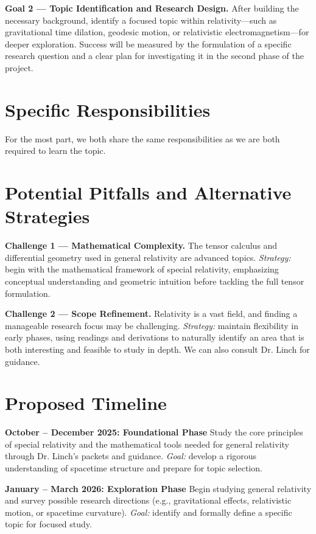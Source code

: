 \documentclass[12pt]{article}
\begin{document}
\textbf{Goal 2 — Topic Identification and Research Design.}  
After building the necessary background, identify a focused topic within relativity—such as gravitational time dilation, geodesic motion, or relativistic electromagnetism—for deeper exploration. Success will be measured by the formulation of a specific research question and a clear plan for investigating it in the second phase of the project.

\section*{Specific Responsibilities}

For the most part, we both share the same responsibilities as we are both required to learn the topic.

\section*{Potential Pitfalls and Alternative Strategies}

\textbf{Challenge 1 — Mathematical Complexity.}  
The tensor calculus and differential geometry used in general relativity are advanced topics.  
\textit{Strategy:} begin with the mathematical framework of special relativity, emphasizing conceptual understanding and geometric intuition before tackling the full tensor formulation.

\textbf{Challenge 2 — Scope Refinement.}  
Relativity is a vast field, and finding a manageable research focus may be challenging.  
\textit{Strategy:} maintain flexibility in early phases, using readings and derivations to naturally identify an area that is both interesting and feasible to study in depth. We can also consult Dr. Linch for guidance.

\section*{Proposed Timeline}

\textbf{October – December 2025: Foundational Phase}  
Study the core principles of special relativity and the mathematical tools needed for general relativity through Dr. Linch's packets and guidance.
\textit{Goal:} develop a rigorous understanding of spacetime structure and prepare for topic selection.

\textbf{January – March 2026: Exploration Phase}  
Begin studying general relativity and survey possible research directions (e.g., gravitational effects, relativistic motion, or spacetime curvature).
\textit{Goal:} identify and formally define a specific topic for focused study.
\end{document}
